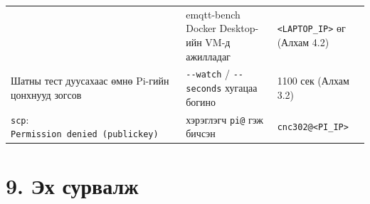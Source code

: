 \begin{longtable}[]{@{}lll@{}}
\begin{minipage}[t]{0.30\columnwidth}
\end{minipage} & \begin{minipage}[t]{0.30\columnwidth}\raggedright
emqtt-bench Docker Desktop-ийн VM-д ажилладаг\strut
\end{minipage} & \begin{minipage}[t]{0.30\columnwidth}\raggedright
\texttt{\textless{}LAPTOP\_\allowbreak{}IP\textgreater{}} өг (Алхам 4.2)\strut
\end{minipage}\tabularnewline
\begin{minipage}[t]{0.30\columnwidth}\raggedright
Шатны тест дуусахаас өмнө Pi-гийн цонхнууд зогсов\strut
\end{minipage} & \begin{minipage}[t]{0.30\columnwidth}\raggedright
\texttt{-\/-watch} / \texttt{-\/-seconds} хугацаа богино\strut
\end{minipage} & \begin{minipage}[t]{0.30\columnwidth}\raggedright
1100 сек (Алхам 3.2)\strut
\end{minipage}\tabularnewline
\begin{minipage}[t]{0.30\columnwidth}\raggedright
\texttt{scp}: \texttt{Permission\ denied\ (publickey)}\strut
\end{minipage} & \begin{minipage}[t]{0.30\columnwidth}\raggedright
хэрэглэгч \texttt{pi@} гэж бичсэн\strut
\end{minipage} & \begin{minipage}[t]{0.30\columnwidth}\raggedright
\texttt{cnc302@\textless{}PI\_\allowbreak{}IP\textgreater{}}\strut
\end{minipage}\tabularnewline
\bottomrule
\end{longtable}\endgroup

\hypertarget{ux44dux445-ux441ux443ux440ux432ux430ux43bux436}{%
\section{9. Эх сурвалж}\label{ux44dux445-ux441ux443ux440ux432ux430ux43bux436}}

